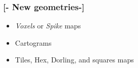 \documentclass[xcolor=x11names,compress]{beamer}
\renewcommand{\(}{\begin{columns}}
\renewcommand{\)}{\end{columns}}
\newcommand{\<}[1]{\begin{column}{#1}}
\renewcommand{\>}{\end{column}}
\begin{document}
\begin{frame} %
\frametitle{\textcolor{brique}{[-  \textbf{New geometries}-]}}
\begin{itemize}
   \item  \textit{Voxels} or \textit{Spike} maps   %
    \item  Cartograms  %
    \item  Tiles, Hex, Dorling,  and squares maps
\end{itemize}
\end{frame}



\end{document}
